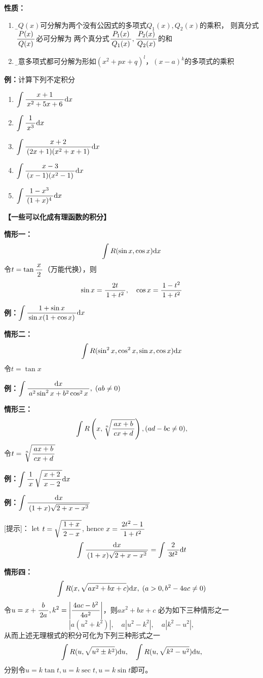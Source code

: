 {\bf 性质：}
\begin{enumerate}
  \setlength{\itemindent}{1cm}
  \item {\b 设$Q(x)$可分解为两个没有公因式的多项式$Q_1(x),Q_2(x)$的乘积，
  则真分式$\df{P(x)}{Q(x)}$必可分解为
  两个真分式$\df{P_1(x)}{Q_1(x)},\df{P_2(x)}{Q_2(x)}$的和}
  \item {\b 任意多项式都可分解为形如$(x^2+px+q)^l$，$(x-a)^k$的多项式的乘积}
\end{enumerate}

{\bf 例：}计算下列不定积分
\begin{enumerate}[(1)]
  \setlength{\itemindent}{1cm}
  \item $\dint\df{x+1}{x^2+5x+6}\d x$ 
  \item $\dint\df1{x^3}\d x$
  \item $\dint\df{x+2}{(2x+1)(x^2+x+1)}\d x$
  \item $\dint\df{x-3}{(x-1)(x^2-1)}\d x$
  \item $\dint\df{1-x^3}{(1+x)^4}\d x$
\end{enumerate}

{\bf 【一些可以化成有理函数的积分】}

{\bf 情形一：}
$$\dint R(\sin x,\cos x)\d x$$
令$t=\tan\df x2$（万能代换），则
$$\sin x=\df{2t}{1+t^2},\quad\cos x=\df{1-t^2}{1+t^2}$$

{\bf 例：}$\dint\df{1+\sin x}{\sin x(1+\cos x)}\d x$

{\bf 情形二：}
$$\dint R(\sin^2x,\cos^2x,\sin x,\cos x)\d x$$
令$t=\tan x$

{\bf 例：}$\dint\df{\d x}{a^2\sin^2x+b^2\cos^2x},\;(ab\ne 0)$

{\bf 情形三：}
$$\dint R\left(x,\sqrt[n]{\df{ax+b}{cx+d}}\right),(ad-bc\ne0),$$
令$t=\sqrt[n]{\df{ax+b}{cx+d}}$

{\bf 例：}$\dint\df1x\sqrt{\df{x+2}{x-2}}\d x$

{\bf 例：}$\dint\df{\d x}{(1+x)\sqrt{2+x-x^2}}$

[提示]： let $t=\sqrt{\df{1+x}{2-x}}$, hence $x=\df{2t^2-1}{1+t^2}$
$$\dint\df{\d x}{(1+x)\sqrt{2+x-x^2}}=\dint\df2{3t^2}\d t$$

{\bf 情形四：}
$$\dint R(x,\sqrt{ax^2+bx+c})\d x,\;(a>0,b^2-4ac\ne0)$$
令$u=x+\df b{2a},k^2=\left|\df{4ac-b^2}{4a^2}\right|$，则$ax^2+bx+c$
必为如下三种情形之一
$$|a(u^2+k^2)|,\quad a|u^2-k^2|,\quad a|k^2-u^2|,$$
从而上述无理根式的积分可化为下列三种形式之一
$$\dint R(u,\sqrt{u^2\pm k^2})\d u,\quad\dint R(u,\sqrt{k^2-u^2})\d u,$$
分别令$u=k\tan t,u=k\sec t,u=k\sin t$即可。

